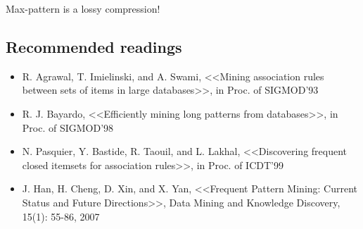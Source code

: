 Max-pattern is a lossy compression!

\subsection{Recommended readings}
\begin{itemize}
\item R. Agrawal, T. Imielinski, and A. Swami, <<Mining association rules between sets of items in large databases>>, in Proc. of SIGMOD'93
\item R. J. Bayardo, <<Efficiently mining long patterns from databases>>, in Proc. of SIGMOD'98
\item N. Pasquier, Y. Bastide, R. Taouil, and L. Lakhal, <<Discovering frequent closed itemsets
for association rules>>, in Proc. of ICDT'99
\item J. Han, H. Cheng, D. Xin, and X. Yan, <<Frequent Pattern Mining: Current Status and Future Directions>>, Data Mining and Knowledge Discovery, 15(1): 55-86, 2007
\end{itemize}
